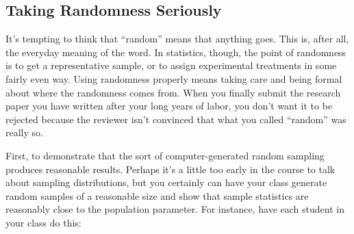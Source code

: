 \subsection{Taking Randomness Seriously}

\label{sec:taking-randomness-seriously}

It's tempting to think that ``random'' means that anything goes.  This
is, after all, the everyday meaning of the word.  In statistics,
though, the point of randomness is to get a representative sample, or
to assign experimental treatments in some fairly even way.   
%
Using
randomness properly means taking care and being formal about where the
randomness comes from.  When you finally submit the research paper you
have written after your long years of labor, you don't want it to be
rejected because the reviewer isn't convinced that what you called
``random'' was really so.

First, to demonstrate that the sort of computer-generated random
sampling produces reasonable results.  Perhaps it's a little too early
in the course to talk about sampling distributions, but you certainly
can have your class generate random samples of a reasonable size and
show that sample statistics are reasonably close to the population parameter.  
%
For
instance, have each student in your class do this:
\begin{knitrout}
\end{knitrout}

